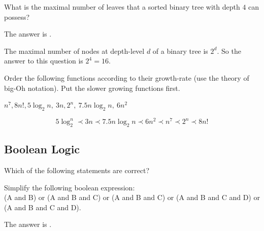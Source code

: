\documentclass{ximera}
\begin{document}
\begin{question}
What is the maximal number of leaves that a sorted binary tree with depth $4$ can possess?
\begin{solution}
The answer is .
\end{solution}
The maximal number of nodes at depth-level $d$ of a binary tree is $2^d$. So the answer to this question is $2^4 = 16$. 
\end{question}

\begin{question}
Order the following functions according to their growth-rate (use the theory of big-Oh notation). Put the slower growing functions first.

$ n^7, 8n!, 5 \log_2 n,~ 3n, 2^n, ~ 7.5 n\log_2 n, ~ 6 n^2$ 

\begin{solution}
\end{solution}
\begin{equation*}
5 \log_2^n \prec 3n \prec 7.5 n \log_2{n} \prec 6n^2 \prec n^7 \prec 2^n \prec 8n!
\end{equation*}
\end{question}

\subsection*{Boolean Logic}

\begin{question}
Which of the following statements are correct?
\begin{solution}
\begin{multiple-choice}
\end{multiple-choice}
\end{solution}
\end{question}

\begin{question}
Simplify the following boolean expression: \\
(A and B) or (A and B and C) or (A and B and C) or (A and B and C and D) or (A and B and C and D).
\begin{solution}
The answer is . 
\end{solution}
\end{question}
\end{document}
